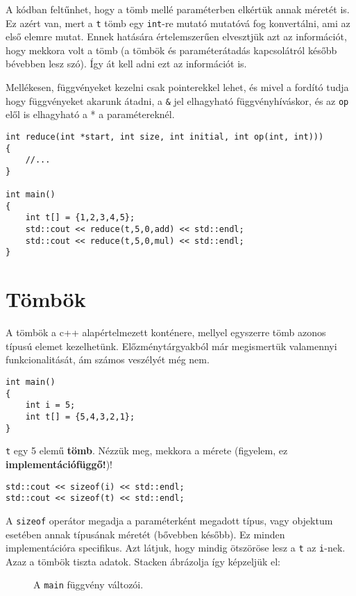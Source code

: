 \documentclass[a4paper,11.5pt,table]{article}
\begin{document}
	A kódban feltűnhet, hogy a tömb mellé paraméterben elkértük annak méretét is. Ez azért van, mert a \texttt{t} tömb egy \texttt{int}-re mutató mutatóvá fog konvertálni, ami az első elemre mutat. Ennek hatására értelemszerűen elvesztjük azt az információt, hogy mekkora volt a tömb (a tömbök és paraméterátadás kapcsolátról később bévebben lesz szó). Így át kell adni ezt az információt is. 
	
	Mellékesen, függvényeket kezelni csak pointerekkel lehet, és mivel a fordító tudja hogy függvényeket akarunk átadni, a \texttt{\&} jel elhagyható függvényhíváskor, és az \texttt{op} elől is elhagyható a * a paramétereknél.
	\begin{lstlisting}
int reduce(int *start, int size, int initial, int op(int, int)))
{
	//...
}

int main()
{
	int t[] = {1,2,3,4,5};
	std::cout << reduce(t,5,0,add) << std::endl;
	std::cout << reduce(t,5,0,mul) << std::endl;
}
	\end{lstlisting}
	\section{Tömbök}
	A tömbök a c++ alapértelmezett konténere, mellyel egyszerre tömb azonos típusú elemet kezelhetünk. Előzménytárgyakból már megismertük valamennyi funkcionalitását, ám számos veszélyét még nem.
		\begin{lstlisting}
int main()
{
	int i = 5;
	int t[] = {5,4,3,2,1};
}
		\end{lstlisting}
		\texttt{t} egy 5 elemű \textbf{tömb}. Nézzük meg, mekkora a mérete (figyelem, ez \textbf{implementációfüggő!})!
		\begin{lstlisting}
std::cout << sizeof(i) << std::endl;
std::cout << sizeof(t) << std::endl;
		\end{lstlisting}
		A \texttt{sizeof} operátor megadja a paraméterként megadott típus, vagy objektum esetében annak típusának méretét (bővebben később). Ez minden implementációra specifikus. Azt látjuk, hogy mindig ötszöröse lesz a \texttt{t} az \texttt{i}-nek. Azaz a tömbök tiszta adatok.  Stacken ábrázolja így képzeljük el:
		
		\begin{figure}[!h]
			\centering
			\smallskip
			
			A \texttt{main} függvény változói.
		\end{figure}
\end{document}

